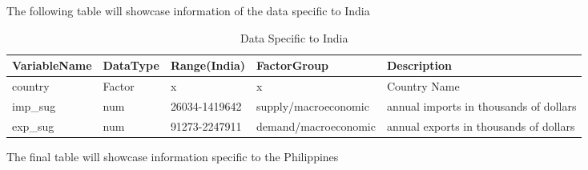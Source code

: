 \documentclass[11pt]{article}
\begin{document}
The following table will showcase information of the data specific to India
\FloatBarrier
\begin{table}[!htbp]
\small
\centering
\begin{adjustbox}{max width=\textwidth}
\begin{tabular}{lllll}
\hline
VariableName & DataType & Range(India)  & FactorGroup          & Description                            \\  \hline
country      & Factor   & x             & x                    & Country Name                           \\
imp\_sug     & num      & 26034-1419642 & supply/macroeconomic & annual imports in thousands of dollars \\
exp\_sug     & num      & 91273-2247911 & demand/macroeconomic & annual exports in thousands of dollars \\ \hline
\end{tabular}
\end{adjustbox}
\caption{Data Specific to India}
\label{table4l}
\end{table}
\FloatBarrier

The final table will showcase information specific to the Philippines 
\FloatBarrier
\begin{table}[!htbp]
\centering
{}
\caption{Data Specific to Philippines}
\label{table5}
\end{table}
\FloatBarrier
\end{document}
